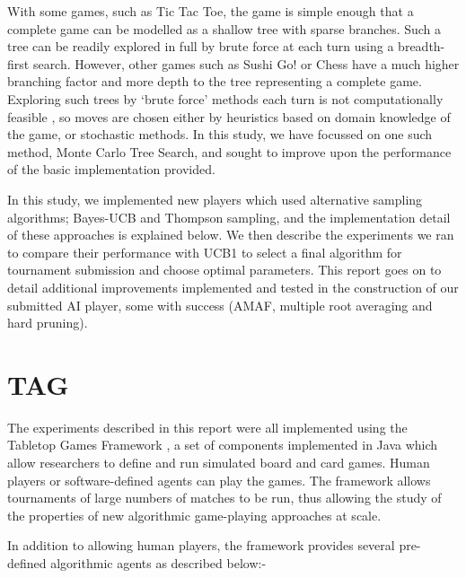 \documentclass[conference]{IEEEtran}
\begin{document}
With some games, such as Tic Tac Toe, the game is simple enough that a complete game can be modelled as a shallow tree with sparse branches. Such a tree can be readily explored in full by brute force at each turn using a breadth-first search. However, other games such as Sushi Go! or Chess have a much higher branching factor and more depth to the tree representing a complete game. Exploring such trees by ‘brute force’ methods each turn is not computationally feasible \cite{b1}, so moves are chosen either by heuristics based on domain knowledge of the game, or stochastic methods. In this study, we have focussed on one such method, Monte Carlo Tree Search, and sought to improve upon the performance of the basic implementation provided.

In this study, we implemented new players which used alternative sampling algorithms; Bayes-UCB and Thompson sampling, and the implementation detail of these approaches is explained below. We then describe the experiments we ran to compare their performance with UCB1 to select a final algorithm for tournament submission and choose optimal parameters. This report goes on to detail additional improvements implemented and tested in the construction of our submitted AI player, some with success (AMAF, multiple root averaging and hard pruning). 


\section{TAG}

The experiments described in this report were all implemented using the Tabletop Games Framework \cite{b2}, a set of components implemented in Java which allow researchers to define and run simulated board and card games. Human players or software-defined agents can play the games. The framework allows tournaments of large numbers of matches to be run, thus allowing the study of the properties of new algorithmic game-playing approaches at scale. 

In addition to allowing human players, the framework provides several pre-defined algorithmic agents as described below:-
\end{document}
